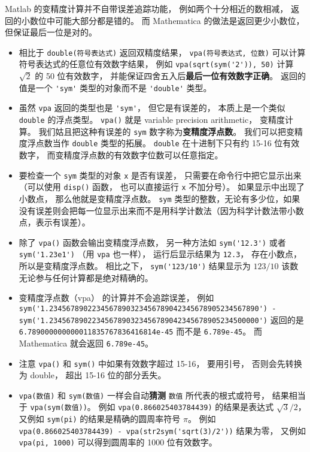 Matlab 的变精度计算并不自带误差追踪功能， 例如两个十分相近的数相减， 返回的小数位中可能大部分都是错的。 而 Mathematica 的做法是返回更少小数位， 但保证最后一位是对的。

\begin{itemize}
\item 相比于 \verb`double(符号表达式)` 返回双精度结果， \verb`vpa(符号表达式, 位数)` 可以计算符号表达式的任意位有效数字结果， 例如 \verb`vpa(sqrt(sym('2')), 50)` 计算 $\sqrt{2}$ 的 50 位有效数字， 并能保证四舍五入后\textbf{最后一位有效数字正确}。 返回的值是一个 \verb`'sym'` 类型的对象而不是 \verb`'double'` 类型。

\item 虽然 \verb`vpa` 返回的类型也是 \verb`'sym'`， 但它是有误差的， 本质上是一个类似 \verb`double` 的浮点类型。 \verb`vpa()` 就是 variable precision arithmetic， 变精度计算。 我们姑且把这种有误差的 \verb`sym` 数字称为\textbf{变精度浮点数}。 我们可以把变精度浮点数当作 \verb`double` 类型的拓展。 \verb`double` 在十进制下只有约 15-16 位有效数字， 而变精度浮点数的有效数字位数可以任意指定。

\item 要检查一个 \verb`sym` 类型的对象 \verb`x` 是否有误差， 只需要在命令行中把它显示出来（可以使用 \verb`disp()` 函数， 也可以直接运行 \verb`x` 不加分号）。 如果显示中出现了小数点， 那么他就是变精度浮点数。 \verb`sym` 类型的整数，无论有多少位，如果没有误差则会把每一位显示出来而不是用科学计数法（因为科学计数法带小数点，表示有误差）。

\item 除了 \verb`vpa()` 函数会输出变精度浮点数， 另一种方法如 \verb`sym('12.3')` 或者 \verb`sym('1.23e1')` （用 \verb`vpa` 也一样）， 运行后显示结果为 \verb`12.3`， 存在小数点， 所以是变精度浮点数。 相比之下， \verb`sym('123/10')` 结果显示为 $123/10$ 该数无论参与任何计算都是绝对精确的。

\item 变精度浮点数（vpa） 的计算并不会追踪误差， 例如 \verb`sym('1.2345678902234567890323456789042345678905234567890') - sym('1.2345678902234567890323456789042345678905234500000')` 返回的是 \verb`6.789000000000011835767836416814e-45` 而不是 \verb`6.789e-45`。 而 Mathematica 就会返回 \verb`6.789e-45`。

\item 注意 \verb`vpa()` 和 \verb`sym()` 中如果有效数字超过 15-16， 要用引号， 否则会先转换为 double， 超出 15-16 位的部分丢失。

\item \verb`vpa(数值)` 和 \verb`sym(数值)` 一样会自动\textbf{猜测} \verb`数值` 所代表的根式或符号， 结果相当于 \verb`vpa(sym(数值))`。 例如 \verb`vpa(0.866025403784439)` 的结果是表达式 $\sqrt{3}/2$， 又例如 \verb`sym(pi)` 的结果是精确的圆周率符号 $\pi$。 例如 \verb`vpa(0.866025403784439) - vpa(str2sym('sqrt(3)/2'))` 结果为零， 又例如 \verb`vpa(pi, 1000)` 可以得到圆周率的 1000 位有效数字。


\end{itemize}
